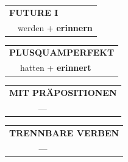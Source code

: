 \documentclass[10pt,a4paper]{revtex4-2}
\begin{document}
\begin{verbbox-acc}
\begin{tabular}{rl}
    \multicolumn{2}{l}{\textbf{FUTURE I} }\\
   & werden + \textbf{erinnern}\\
 
  \end{tabular}
\hfill
   \begin{tabular}{rl}
      \multicolumn{2}{l}{\textbf{PLUSQUAMPERFEKT}}\\
   & hatten + \textbf{erinnert}\\
  \end{tabular}
  
  \vspace{10pt}

\begin{tabular}{lll}
\multicolumn{3}{l}{\textbf{MIT PRÄPOSITIONEN}}\\
& ---\\
\end{tabular}
\hfill
\begin{tabular}{lll}
\multicolumn{3}{l}{\textbf{TRENNBARE VERBEN}}\\
& ---\\
\end{tabular}

  \vspace{-5pt}


\end{verbbox-acc}
\end{document}
